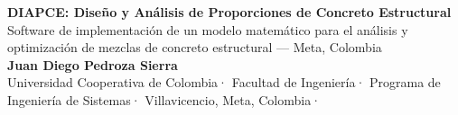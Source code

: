 \documentclass[10pt]{article}
\begin{document}
\begin{tcolorbox}[
  enhanced,
  colback=pinkprimary,
  colframe=pinkprimary,
  arc=6pt, boxrule=0pt,
  top=10mm, bottom=8mm, left=14mm, right=14mm
]
  \centering
  {\fontsize{32}{38}\selectfont\bfseries\color{white}
    DIAPCE: Diseño y Análisis de Proporciones de Concreto Estructural%
  }\\[5mm]
  {\fontsize{15}{19}\selectfont\color{pinksecondary}
    Software de implementación de un modelo matemático para el análisis y
    optimización de mezclas de concreto estructural — Meta, Colombia%
  }\\[7mm]
  {\fontsize{13}{17}\selectfont\bfseries\color{white}
    Juan Diego Pedroza Sierra%
  }\\[3mm]
  {\fontsize{11}{15}\selectfont\color{pinksecondary}
    Universidad Cooperativa de Colombia\enspace·\enspace
    Facultad de Ingeniería\enspace·\enspace
    Programa de Ingeniería de Sistemas\enspace·\enspace
    Villavicencio, Meta, Colombia\enspace·%
  }
\end{tcolorbox}

\vspace{5mm}
\end{document}
